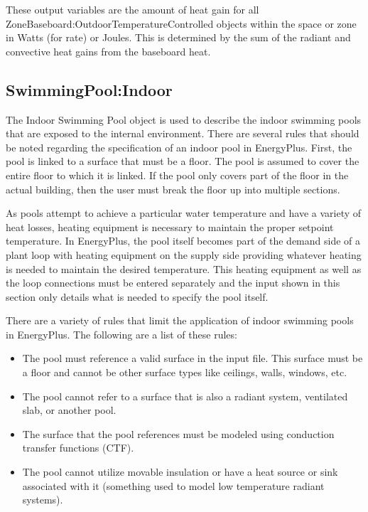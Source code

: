 These output variables are the amount of heat gain for all Zone\-Baseboard:\-Outdoor\-Temperature\-Controlled objects within the space or zone in Watts (for rate) or Joules. This is determined by the sum of the radiant and convective heat gains from the baseboard heat.


\subsection{SwimmingPool:Indoor}\label{swimmingpoolindoor}

The Indoor Swimming Pool object is used to describe the indoor swimming pools that are exposed to the internal environment. There are several rules that should be noted regarding the specification of an indoor pool in EnergyPlus. First, the pool is linked to a surface that must be a floor. The pool is assumed to cover the entire floor to which it is linked. If the pool only covers part of the floor in the actual building, then the user must break the floor up into multiple sections.

As pools attempt to achieve a particular water temperature and have a variety of heat losses, heating equipment is necessary to maintain the proper setpoint temperature. In EnergyPlus, the pool itself becomes part of the demand side of a plant loop with heating equipment on the supply side providing whatever heating is needed to maintain the desired temperature. This heating equipment as well as the loop connections must be entered separately and the input shown in this section only details what is needed to specify the pool itself.

There are a variety of rules that limit the application of indoor swimming pools in EnergyPlus. The following are a list of these rules:

\begin{itemize}
  \item The pool must reference a valid surface in the input file. This surface must be a floor and cannot be other surface types like ceilings, walls, windows, etc.
  \item The pool cannot refer to a surface that is also a radiant system, ventilated slab, or another pool.
  \item The surface that the pool references must be modeled using conduction transfer functions (CTF).
  \item The pool cannot utilize movable insulation or have a heat source or sink associated with it (something used to model low temperature radiant systems).
\end{itemize}

